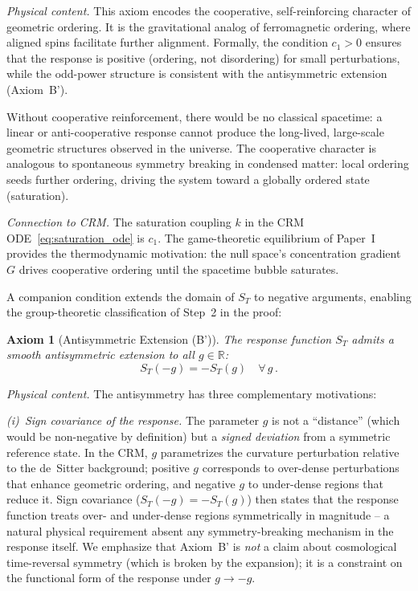\documentclass[aps,prd,twocolumn,superscriptaddress,nofootinbib]{revtex4-2}
\newtheorem{axiom}{Axiom}
\begin{document}
\textit{Physical content.} This axiom encodes the cooperative, self-reinforcing character of geometric ordering. It is the gravitational analog of ferromagnetic ordering, where aligned spins facilitate further alignment. Formally, the condition $c_1 > 0$ ensures that the response is positive (ordering, not disordering) for small perturbations, while the odd-power structure is consistent with the antisymmetric extension (Axiom~B').

Without cooperative reinforcement, there would be no classical spacetime: a linear or anti-cooperative response cannot produce the long-lived, large-scale geometric structures observed in the universe. The cooperative character is analogous to spontaneous symmetry breaking in condensed matter: local ordering seeds further ordering, driving the system toward a globally ordered state (saturation).

\textit{Connection to CRM.} The saturation coupling $k$ in the CRM ODE~\eqref{eq:saturation_ode} is $c_1$. The game-theoretic equilibrium of Paper~I \cite{Geiger2026} provides the thermodynamic motivation: the null space's concentration gradient $G$ drives cooperative ordering until the spacetime bubble saturates.

A companion condition extends the domain of $S_T$ to negative arguments, enabling the group-theoretic classification of Step~2 in the proof:

\begin{axiom}[Antisymmetric Extension (B')]
\label{ax:antisymmetry}
The response function $S_T$ admits a smooth antisymmetric extension to all $g \in \mathbb{R}$:
\begin{equation}
S_T(-g) = -S_T(g) \quad \forall\, g\,.
\label{eq:antisymmetry}
\end{equation}
\end{axiom}

\textit{Physical content.} The antisymmetry has three complementary motivations:

\textit{(i)~Sign covariance of the response.} The parameter $g$ is not a ``distance'' (which would be non-negative by definition) but a \textit{signed deviation} from a symmetric reference state. In the CRM, $g$ parametrizes the curvature perturbation relative to the de~Sitter background; positive $g$ corresponds to over-dense perturbations that enhance geometric ordering, and negative $g$ to under-dense regions that reduce it. Sign covariance ($S_T(-g) = -S_T(g)$) then states that the response function treats over- and under-dense regions symmetrically in magnitude -- a natural physical requirement absent any symmetry-breaking mechanism in the response itself. We emphasize that Axiom~B' is \textit{not} a claim about cosmological time-reversal symmetry (which is broken by the expansion); it is a constraint on the functional form of the response under $g \to -g$.
\end{document}
